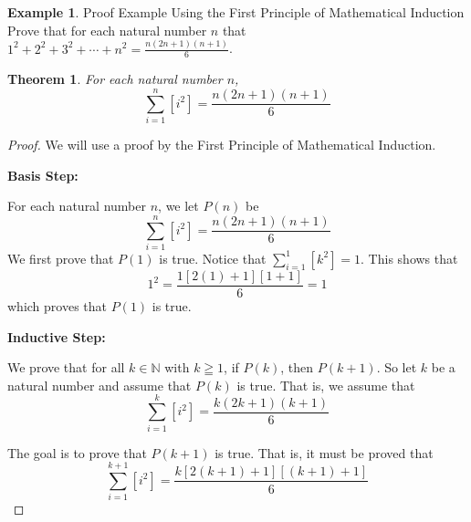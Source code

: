 \documentclass{book}
\newtheorem{theorem}{Theorem}[section]
\theoremstyle{definition}
\newtheorem{example}{Example}[definition]
\theoremstyle{remark}
\newcommand{\bb}[1]{\mathbb{#1}}
\begin{document}
\newpage
\begin{example}
Proof Example Using the First Principle of Mathematical Induction \\

Prove that for each natural number $n$ that $1^2 + 2^2 + 3^2 + \cdots + n^2 = \frac{n(2n+1)(n+1)}{6}$. 
    \begin{tcolorbox}
        \begin{theorem}
            For each natural number $n$,
                \begin{equation*}
                    \sum_{i=1}^{n}{[i^2]} = \frac{n(2n+1)(n+1)}{6} 
                \end{equation*}
        \end{theorem}
    \end{tcolorbox}

    \begin{proof}
        We will use a proof by the First Principle of Mathematical Induction. \\
        
        \begin{flushleft} \textbf{Basis Step:} \end{flushleft}
        For each natural number $n$, we let $P(n)$ be
            \begin{equation*}
                \sum_{i=1}^{n}{[i^2]} = \frac{n(2n+1)(n+1)}{6} 
            \end{equation*}
        We first prove that $P(1)$ is true. Notice that $\sum_{i=1}^{1}{[k^2]} = 1$. This shows that   
            \begin{equation*}
                 1^2 = \frac{1[2(1)+1][1+1]}{6} = 1
            \end{equation*}
        which proves that $P(1)$ is true. \\
        
        \begin{flushleft} \textbf{Inductive Step:} \end{flushleft}
        We prove that for all $k \in \bb{N}$ with $k \geqq 1$, if $P(k)$, then $P(k+1)$. So let $k$ be a natural number and assume that $P(k)$ is true. That is, we assume that 
            \begin{equation*}
               \sum_{i=1}^{k}{[i^2]} = \frac{k(2k+1)(k+1)}{6} 
            \end{equation*}
        
        The goal is to prove that $P(k+1)$ is true. That is, it must be proved that  
            \begin{equation}
            \label{dnef}
                \sum_{i=1}^{k+1}{[i^2]}  = \frac{k[2(k+1)+1][(k+1)+1]}{6} 
            \end{equation}
        

\end{proof}
\end{example}
\end{document}
